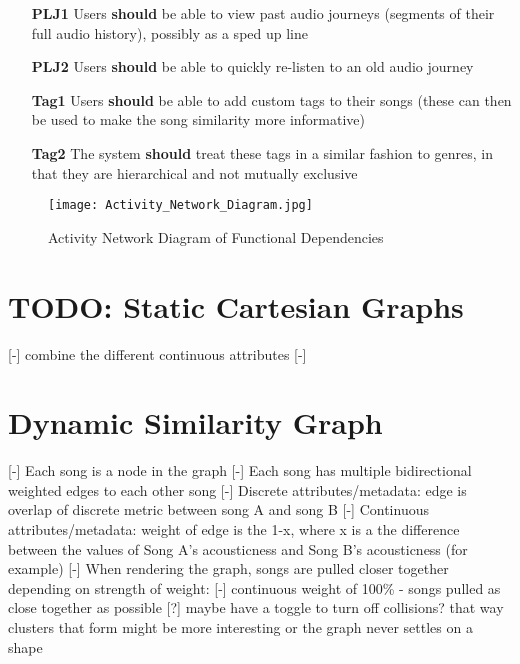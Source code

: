 \begin{itemize}
    \item[\textbf{PLJ1}] Users \textbf{should} be able to view past audio journeys (segments of their full audio history), possibly as a sped up line
    \item[\textbf{PLJ2}] Users \textbf{should} be able to quickly re-listen to an old audio journey
    \item[\textbf{Tag1}] Users \textbf{should} be able to add custom tags to their songs (these can then be used to make the song similarity more informative)
    \item[\textbf{Tag2}] The system \textbf{should} treat these tags in a similar fashion to genres, in that they are hierarchical and not mutually exclusive
\end{itemize}

\begin{figure}
    \texttt{[image: Activity\_Network\_Diagram.jpg]}
    \caption{Activity Network Diagram of Functional Dependencies}
\end{figure}


\section{TODO: Static Cartesian Graphs}
[-] combine the different continuous attributes
[-] 

\section{Dynamic Similarity Graph}
[-] Each song is a node in the graph
[-] Each song has multiple bidirectional weighted edges to each other song
    [-] Discrete attributes/metadata: edge is overlap of discrete metric between song A and song B
    [-] Continuous attributes/metadata: weight of edge is the 1-x, where x is a the difference between the values of Song A's acousticness and Song B's acousticness (for example)
[-] When rendering the graph, songs are pulled closer together depending on strength of weight:
    [-] continuous weight of 100\% - songs pulled as close together as possible
[?] maybe have a toggle to turn off collisions? that way clusters that form might be more interesting or the graph never settles on a shape

